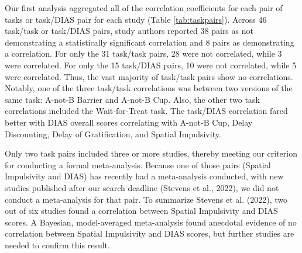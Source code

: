 \documentclass[
  ,pub,floatsintext]{apa6}
\begin{document}
Our first analysis aggregated all of the correlation coefficients for each pair of tasks or task/DIAS pair for each study (Table \ref{tab:taskpairs}). Across 46 task/task or task/DIAS pairs, study authors reported 38 pairs as not demonstrating a statistically significant correlation and 8 pairs as demonstrating a correlation. For only the 31 task/task pairs, 28 were not correlated, while 3 were correlated. For only the 15 task/DIAS pairs, 10 were not correlated, while 5 were correlated. Thus, the vast majority of task/task pairs show no correlations. Notably, one of the three task/task correlations was between two versions of the same task: A-not-B Barrier and A-not-B Cup. Also, the other two task correlations included the Wait-for-Treat task. The task/DIAS correlation fared better with DIAS overall scores correlating with A-not-B Cup, Delay Discounting, Delay of Gratification, and Spatial Impulsivity.

Only two task pairs included three or more studies, thereby meeting our criterion for conducting a formal meta-analysis. Because one of those pairs (Spatial Impulsivity and DIAS) has recently had a meta-analysis conducted, with new studies published after our search deadline (Stevens et al., 2022), we did not conduct a meta-analysis for that pair. To summarize Stevens et al. (2022), two out of six studies found a correlation between Spatial Impulsivity and DIAS scores. A Bayesian, model-averaged meta-analysis found anecdotal evidence of no correlation between Spatial Impulsivity and DIAS scores, but further studies are needed to confirm this result.
\end{document}
